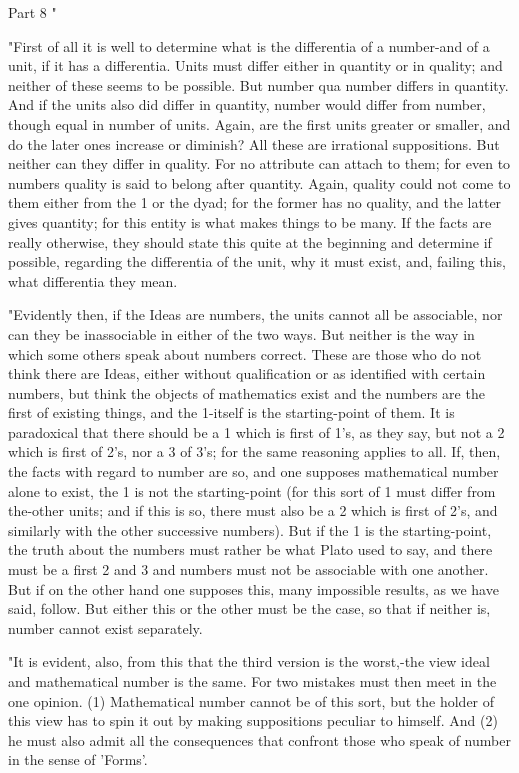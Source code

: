 Part 8 "

"First of all it is well to determine what is the differentia of a
number-and of a unit, if it has a differentia. Units must differ either
in quantity or in quality; and neither of these seems to be possible.
But number qua number differs in quantity. And if the units also did
differ in quantity, number would differ from number, though equal
in number of units. Again, are the first units greater or smaller,
and do the later ones increase or diminish? All these are irrational
suppositions. But neither can they differ in quality. For no attribute
can attach to them; for even to numbers quality is said to belong
after quantity. Again, quality could not come to them either from
the 1 or the dyad; for the former has no quality, and the latter gives
quantity; for this entity is what makes things to be many. If the
facts are really otherwise, they should state this quite at the beginning
and determine if possible, regarding the differentia of the unit,
why it must exist, and, failing this, what differentia they mean.

"Evidently then, if the Ideas are numbers, the units cannot all be
associable, nor can they be inassociable in either of the two ways.
But neither is the way in which some others speak about numbers correct.
These are those who do not think there are Ideas, either without qualification
or as identified with certain numbers, but think the objects of mathematics
exist and the numbers are the first of existing things, and the 1-itself
is the starting-point of them. It is paradoxical that there should
be a 1 which is first of 1's, as they say, but not a 2 which is first
of 2's, nor a 3 of 3's; for the same reasoning applies to all. If,
then, the facts with regard to number are so, and one supposes mathematical
number alone to exist, the 1 is not the starting-point (for this sort
of 1 must differ from the-other units; and if this is so, there must
also be a 2 which is first of 2's, and similarly with the other successive
numbers). But if the 1 is the starting-point, the truth about the
numbers must rather be what Plato used to say, and there must be a
first 2 and 3 and numbers must not be associable with one another.
But if on the other hand one supposes this, many impossible results,
as we have said, follow. But either this or the other must be the
case, so that if neither is, number cannot exist separately.

"It is evident, also, from this that the third version is the worst,-the
view ideal and mathematical number is the same. For two mistakes must
then meet in the one opinion. (1) Mathematical number cannot be of
this sort, but the holder of this view has to spin it out by making
suppositions peculiar to himself. And (2) he must also admit all the
consequences that confront those who speak of number in the sense
of 'Forms'. 

